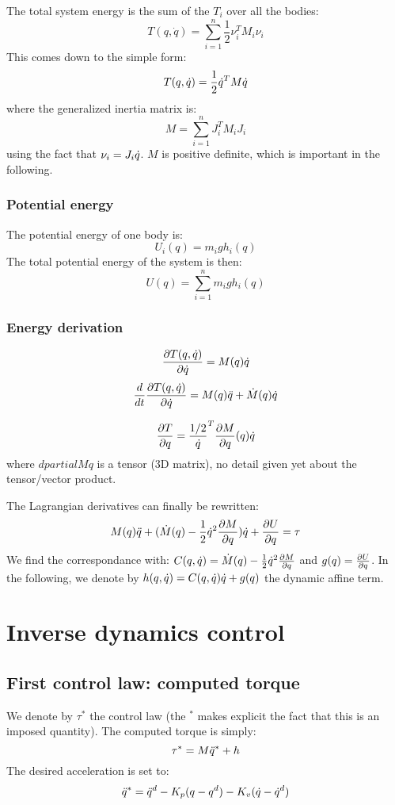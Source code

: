 \documentclass{book}
\begin{document}
The total system energy is the sum of the $T_i$ over all the bodies:
$$ T(q,\dot q) = \sum_{i=1}^n \frac{1}{2} \nu_i^T M_i \nu_i $$
This comes down to the simple form:
$$ T(q,\dot q) = \frac{1}{2} \dot q^T M \dot q $$
where the generalized inertia matrix is: 
$$M =  \sum_{i=1}^n  J_i^T M_i J_i $$
using the fact that $\nu_i = J_i \dot q$. $M$ is positive definite, which is important in the following.

\subsubsection{Potential energy}
The potential energy of one body is:
$$U_i(q) = m_i g h_i(q)$$
The total potential energy of the system is then:
$$ U(q) = \sum_{i=1}^n  m_i g h_i(q)$$

\subsubsection{Energy derivation}
$$ \frac{\partial{T(q,\dot q)}}{\partial{\dot q}} = M(q) \dot q$$
$$ \frac{d}{dt} \frac{\partial{T(q,\dot q)}}{\partial{\dot q}} = M(q) \ddot q + \dot{M}(q) \dot q$$

$$\frac{\partial{T}}{\partial{q}} = \frac{1/2} {\dot q}^T \frac{\partial{M}}{\partial{q}}(q) \dot q$$
where $dpartial{M}{q}$ is a tensor (3D matrix), no detail given yet about the tensor/vector product.

The Lagrangian derivatives  can finally be rewritten:
$$ M(q) \ddot q + (\dot{M}(q) -  \frac{1}{2} \dot q^2 \frac{\partial{M}}{\partial{q}}) \dot q + \frac{\partial{U}}{\partial{q}} = \tau$$
We find the correspondance with: $C(q,\dot q) = \dot{M}(q) -  \frac{1}{2} \dot q^2 \frac{\partial{M}}{\partial{q}}$ and $g(q) = \frac{\partial{U}}{\partial{q}}$. In the following, we denote by $h(q,\dot q) = C(q,\dot q) \dot q+ g(q)$ the dynamic affine term.

\section{Inverse dynamics control}

\subsection{First control law: computed torque}

We denote by $\tau^*$ the control law (the $^*$ makes explicit the fact that this is an imposed quantity). The computed torque is simply:
$$\tau^* = M \ddot q^* + h$$
The desired acceleration is set to:
$$\ddot q^* = \ddot q^d - K_p (q - q^d) - K_v (\dot q - \dot q^d)$$
\end{document}
